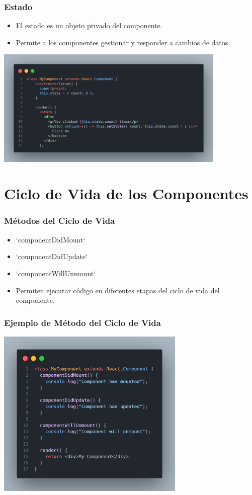 \documentclass[10pt]{beamer}
\begin{document}
\begin{frame}[fragile]
  \frametitle{Estado}
  \begin{itemize}
    \item El estado es un objeto privado del componente.
    \item Permite a los componentes gestionar y responder a cambios de datos.
  \end{itemize}
    \includegraphics[width=110mm,scale=0.25]{04-estado.png}
\end{frame}

\section{Ciclo de Vida de los Componentes}

\begin{frame}
  \frametitle{Métodos del Ciclo de Vida}
  \begin{itemize}
    \item `componentDidMount`
    \item `componentDidUpdate`
    \item `componentWillUnmount`
  \end{itemize}
  \pause
  \begin{itemize}
    \item Permiten ejecutar código en diferentes etapas del ciclo de vida del componente.
  \end{itemize}
\end{frame}

\begin{frame}[fragile]
  \frametitle{Ejemplo de Método del Ciclo de Vida}
    \includegraphics[width=90mm,scale=0.25]{05-cicloDeVida.png}
\end{frame}
\end{document}

